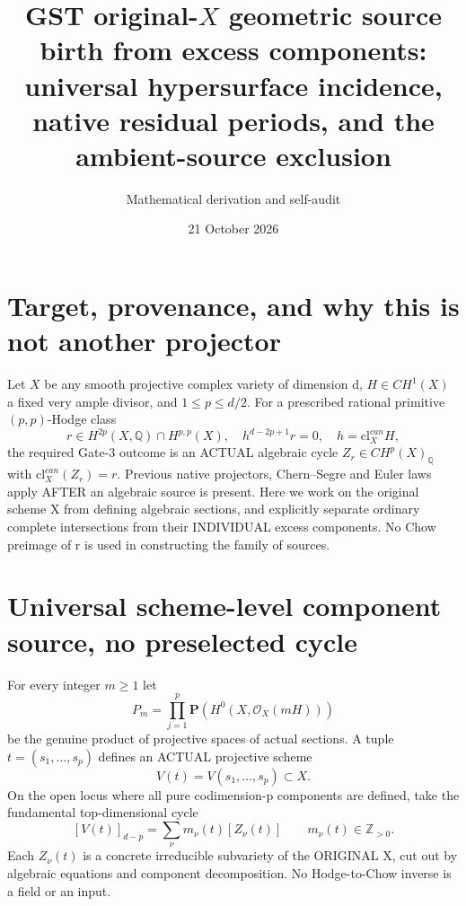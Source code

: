 \documentclass[11pt]{article}
\title{GST original-\(X\) geometric source birth from excess components:
universal hypersurface incidence, native residual periods, and the ambient-source exclusion}
\author{Mathematical derivation and self-audit}
\date{21 October 2026}
\newcommand{\Q}{\mathbb Q}
\newcommand{\cl}{\mathrm{cl}}
\newcommand{\OO}{\mathcal O}
\begin{document}
\maketitle
\section{Target, provenance, and why this is not another projector}
Let \(X\) be any smooth projective complex variety of dimension d,
\(H\in CH^1(X)\) a fixed very ample divisor, and \(1\le p\le d/2\).
For a prescribed rational primitive \((p,p)\)-Hodge class
\[
 r\in H^{2p}(X,\Q)\cap H^{p,p}(X),\quad
 h^{d-2p+1}r=0,\quad h=\cl_X^{can}H,
\]
the required Gate-3 outcome is an ACTUAL algebraic cycle
\(Z_r\in CH^p(X)_\Q\) with \(\cl_X^{can}(Z_r)=r\).
Previous native projectors, Chern--Segre and Euler laws apply AFTER an
algebraic source is present. Here we work on the original scheme X
from defining algebraic sections, and explicitly separate ordinary
complete intersections from their INDIVIDUAL excess components.
No Chow preimage of r is used in constructing the family of sources.

\section{Universal scheme-level component source, no preselected cycle}
For every integer \(m\ge1\) let
\[
 P_m=\prod_{j=1}^{p}\mathbf P(H^0(X,\OO_X(mH)))
\]
be the genuine product of projective spaces of actual sections.
A tuple \(t=(s_1,\ldots,s_p)\) defines an ACTUAL projective scheme
\[
 V(t)=V(s_1,\ldots,s_p)\subset X.
\]
On the open locus where all pure codimension-p components are defined,
take the fundamental top-dimensional cycle
\[
 [V(t)]_{d-p}=\sum_{\nu}m_\nu(t)[Z_\nu(t)]
       \qquad m_\nu(t)\in\mathbb Z_{>0}.
\]
Each \(Z_\nu(t)\) is a concrete irreducible subvariety of the
ORIGINAL X, cut out by algebraic equations and component decomposition.
No Hodge-to-Chow inverse is a field or an input.
\end{document}
